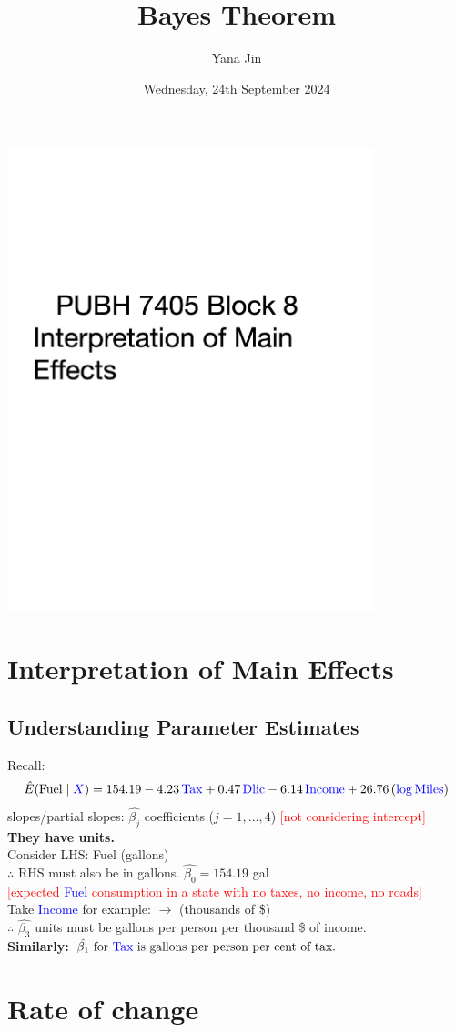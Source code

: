 \documentclass[14pt]{extarticle}
\title{Bayes Theorem}
\author{Yana Jin}
\date{Wednesday, 24th September 2024}
\newcommand{\coverpage}{%
    \begin{titlepage}
        \centering
        \includegraphics[width=0.8\textwidth]{cover.png}
    \end{titlepage}
}
\begin{document}
\coverpage

\newpage

\section*{Interpretation of Main Effects}

\subsection*{Understanding Parameter Estimates}

\noindent
Recall:
\[
\hat{E}(\text{Fuel} \mid \textcolor{blue}{X}) = 154.19 - 4.23 \, \textcolor{blue}{\text{Tax}} + 0.47 \, \textcolor{blue}{\text{Dlic}} - 6.14 \, \textcolor{blue}{\text{Income}} + 26.76 \, (\textcolor{blue}{\log \text{Miles}})
\]
slopes/partial slopes: $\hat{\beta_j}$ coefficients ($j = 1, \dots, 4$) \textcolor{red}{[not considering intercept]} \\
\textbf{They have units.} \\
Consider LHS: Fuel (gallons) \\
$\therefore$ RHS must also be in gallons. $\hat{\beta_0} = 154.19$ gal\\
\textcolor{red}{[expected \textcolor{blue}{Fuel} consumption in a state with no taxes, no income, no roads]} \\
Take \textcolor{blue}{Income} for example: $\rightarrow$ (thousands of \$) \\
$\therefore$ $\hat{\beta_3}$ units must be gallons per person per thousand \$ of income.\\
\textbf{Similarly:}
$\hat{\beta_1} \text{ for } \textcolor{blue}{\text{Tax}} \text{ is gallons per person per cent of tax.}$

\section*{Rate of change}
\end{document}
